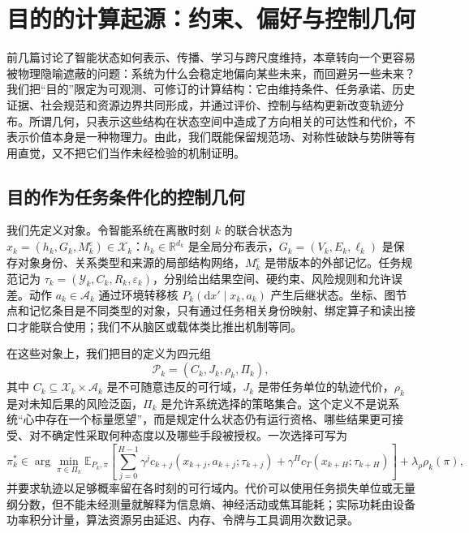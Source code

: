 \chapter{目的的计算起源：约束、偏好与控制几何}
\label{chp:purpose_geometric_origin}

前几篇讨论了智能状态如何表示、传播、学习与跨尺度维持，本章转向一个更容易被物理隐喻遮蔽的问题：系统为什么会稳定地偏向某些未来，而回避另一些未来？我们把“目的”限定为可观测、可修订的计算结构：它由维持条件、任务承诺、历史证据、社会规范和资源边界共同形成，并通过评价、控制与结构更新改变轨迹分布。所谓几何，只表示这些结构在状态空间中造成了方向相关的可达性和代价，不表示价值本身是一种物理力。由此，我们既能保留规范场、对称性破缺与势阱等有用直觉，又不把它们当作未经检验的机制证明。

\section{目的作为任务条件化的控制几何}
\label{sec:section_3149}

我们先定义对象。令智能系统在离散时刻 $k$ 的联合状态为 $x_k=(h_k,G_k,M_k^{e})\in\mathcal{X}_k$：$h_k\in\mathbb{R}^{d_k}$ 是全局分布表示，$G_k=(V_k,E_k,\ell_k)$ 是保存对象身份、关系类型和来源的局部结构网络，$M_k^{e}$ 是带版本的外部记忆。任务规范记为 $\tau_k=(\mathcal{Y}_k,C_k,R_k,\varepsilon_k)$，分别给出结果空间、硬约束、风险规则和允许误差。动作 $a_k\in\mathcal{A}_k$ 通过环境转移核 $P_k(\mathrm{d}x'\mid x_k,a_k)$ 产生后继状态。坐标、图节点和记忆条目是不同类型的对象，只有通过任务相关身份映射、绑定算子和读出接口才能联合使用；我们不从脑区或载体类比推出机制等同。

在这些对象上，我们把目的定义为四元组
\[
\mathcal{P}_k=(C_k,J_k,\rho_k,\Pi_k),
\]
其中 $C_k\subseteq\mathcal{X}_k\times\mathcal{A}_k$ 是不可随意违反的可行域，$J_k$ 是带任务单位的轨迹代价，$\rho_k$ 是对未知后果的风险泛函，$\Pi_k$ 是允许系统选择的策略集合。这个定义不是说系统“心中存在一个标量愿望”，而是规定什么状态仍有运行资格、哪些结果更可接受、对不确定性采取何种态度以及哪些手段被授权。一次选择可写为
\[
\pi_k^*\in\arg\min_{\pi\in\Pi_k}\mathbb{E}_{P_k,\pi}
\left[\sum_{j=0}^{H-1}\gamma^j c_{k+j}(x_{k+j},a_{k+j};\tau_{k+j})
+\gamma^H c_T(x_{k+H};\tau_{k+H})\right]+\lambda_\rho\rho_k(\pi),
\]
并要求轨迹以足够概率留在各时刻的可行域内。代价可以使用任务损失单位或无量纲分数，但不能未经测量就解释为信息熵、神经活动或焦耳能耗；实际功耗由设备功率积分计量，算法资源另由延迟、内存、令牌与工具调用次数记录。

